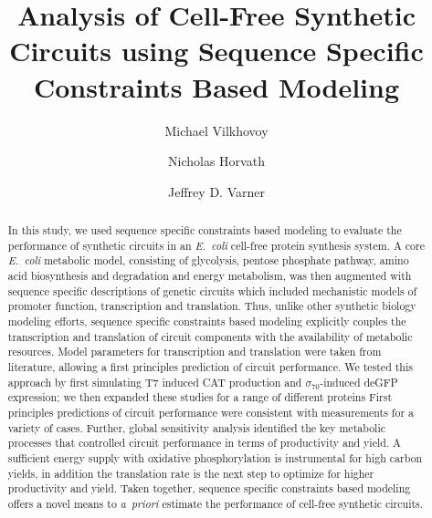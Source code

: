 \documentclass[journal=asbcd6,manuscript=article]{achemso}
\author{Michael Vilkhovoy}
\author{Nicholas Horvath}
\author{Jeffrey D. Varner}
\affiliation[Cornell University]
{Robert Frederick Smith School of Chemical and Biomolecular Engineering, Cornell University, Ithaca, NY 14853}
\title{Analysis of Cell-Free Synthetic Circuits using Sequence Specific Constraints Based Modeling}
\begin{document}


\begin{abstract}
In this study, we used sequence specific constraints based modeling to evaluate the performance of synthetic circuits in an \emph{E.~coli} cell-free protein synthesis system.
A core \emph{E.~coli} metabolic model, consisting of glycolysis, pentose phosphate pathway, amino acid biosynthesis and degradation and energy metabolism, was then augmented with sequence specific descriptions of genetic circuits which included mechanistic models of promoter function, transcription and translation.
Thus, unlike other synthetic biology modeling efforts, sequence specific constraints based modeling explicitly couples the transcription and translation of circuit components with the availability of metabolic resources.
Model parameters for transcription and translation were taken from literature, allowing a first principles prediction of circuit performance.
We tested this approach by first simulating T7 induced CAT production and $\sigma_{70}$-induced deGFP expression; we then expanded these studies for a range of different proteins
First principles predictions of circuit performance were consistent with measurements for a variety of cases.
Further, global sensitivity analysis identified the key metabolic processes that controlled circuit performance in terms of productivity and yield.
A sufficient energy supply with oxidative phosphorylation is instrumental for high carbon yields, in addition the translation rate is the next step to optimize for higher productivity and yield. 
Taken together, sequence specific constraints based modeling offers a novel means to \emph{a~priori} estimate the performance of cell-free synthetic circuits.
\end{abstract}

\end{document}
